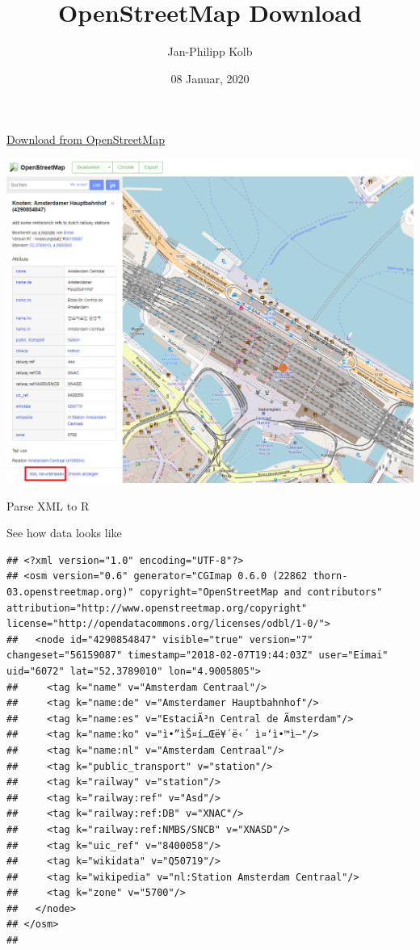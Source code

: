 \documentclass[
  ignorenonframetext,
]{beamer}
\title{OpenStreetMap Download}
\author{Jan-Philipp Kolb}
\date{08 Januar, 2020}
\begin{document}
\frame{\titlepage}

\begin{frame}{\href{https://www.openstreetmap.org/}{Download from
OpenStreetMap}}
\protect\hypertarget{download-from-openstreetmap}{}

\includegraphics{figure/DownloadAmsterdamCentraal.PNG}

\end{frame}

\begin{frame}{Parse XML to R}
\protect\hypertarget{parse-xml-to-r}{}

\end{frame}

\begin{frame}[fragile]{See how data looks like}
\protect\hypertarget{see-how-data-looks-like}{}

\begin{verbatim}
## <?xml version="1.0" encoding="UTF-8"?>
## <osm version="0.6" generator="CGImap 0.6.0 (22862 thorn-03.openstreetmap.org)" copyright="OpenStreetMap and contributors" attribution="http://www.openstreetmap.org/copyright" license="http://opendatacommons.org/licenses/odbl/1-0/">
##   <node id="4290854847" visible="true" version="7" changeset="56159087" timestamp="2018-02-07T19:44:03Z" user="Eimai" uid="6072" lat="52.3789010" lon="4.9005805">
##     <tag k="name" v="Amsterdam Centraal"/>
##     <tag k="name:de" v="Amsterdamer Hauptbahnhof"/>
##     <tag k="name:es" v="EstaciÃ³n Central de Ãmsterdam"/>
##     <tag k="name:ko" v="ì•”ìŠ¤í…Œë¥´ë‹´ ì¤‘ì•™ì—­"/>
##     <tag k="name:nl" v="Amsterdam Centraal"/>
##     <tag k="public_transport" v="station"/>
##     <tag k="railway" v="station"/>
##     <tag k="railway:ref" v="Asd"/>
##     <tag k="railway:ref:DB" v="XNAC"/>
##     <tag k="railway:ref:NMBS/SNCB" v="XNASD"/>
##     <tag k="uic_ref" v="8400058"/>
##     <tag k="wikidata" v="Q50719"/>
##     <tag k="wikipedia" v="nl:Station Amsterdam Centraal"/>
##     <tag k="zone" v="5700"/>
##   </node>
## </osm>
## 
\end{verbatim}

\end{frame}
\end{document}
